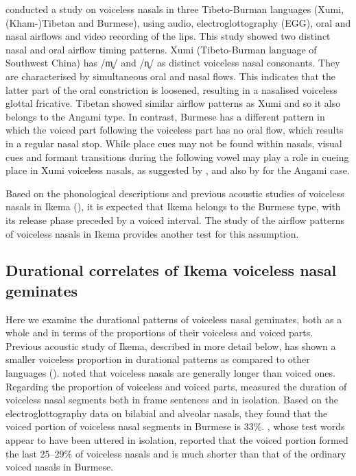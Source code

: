\documentclass[output=paper]{langscibook}
\begin{document}
\citet{ChirkovaEtAl2019} conducted a study on voiceless nasals in three Tibeto-Burman languages (Xumi, (Kham-)Tibetan and Burmese), using audio, electroglottography (EGG), oral and nasal airflows and video recording of the lips. This study showed two distinct nasal and oral airflow timing patterns. Xumi (Tibeto-Burman language of Southwest China) has /m̥/ and /n̥/ as distinct voiceless nasal consonants. They are characterised by simultaneous oral and nasal flows. This indicates that the latter part of the oral constriction is loosened, resulting in a nasalised voiceless glottal fricative. Tibetan showed similar airflow patterns as Xumi and so it also belongs to the Angami type. In contrast, Burmese has a different pattern in which the voiced part following the voiceless part has no oral flow, which results in a regular nasal stop. While place cues may not be found within nasals, visual cues and formant transitions during the following vowel may play a role in cueing place in Xumi voiceless nasals, as suggested by \citet{ChirkovaEtAl2019}, and also by \citet{GogoiWayland2018} for the Angami case. 

Based on the phonological descriptions and previous acoustic studies of voiceless nasals in Ikema (\citealt{Hirayama1983,Uchima1984,Hayashi2007,Hayashi2010,IgarashiEtAl2011,Takubo2021,NakamaEtAl2022,ShinoharaFujimoto2018}), it is expected that Ikema belongs to the Burmese type, with its release phase preceded by a voiced interval. The study of the airflow patterns of voiceless nasals in Ikema provides another test for this assumption.

\subsection{Durational correlates of Ikema voiceless nasal geminates}\label{sec:shinohara:2.2}
Here we examine the durational patterns of voiceless nasal geminates, both as a whole and in terms of the proportions of their voiceless and voiced parts. Previous acoustic study of Ikema, described in more detail below, has shown a smaller voiceless proportion in durational patterns as compared to other languages (\citealt{ShinoharaFujimoto2018}). \citet[111]{LadefogedMaddieson1996} noted that voiceless nasals are generally longer than voiced ones. Regarding the proportion of voiceless and voiced parts, \citet{ChirkovaEtAl2019} measured the duration of voiceless nasal segments both in frame sentences and in isolation. Based on the electroglottography data on bilabial and alveolar nasals, they found that the voiced portion of voiceless nasal segments in Burmese is 33\%. \citet[2]{Dantsuji1986}, whose test words appear to have been uttered in isolation, reported that the voiced portion formed the last 25--29\% of voiceless nasals and is much shorter than that of the ordinary voiced nasals in Burmese.
\end{document}
